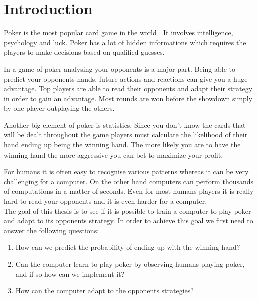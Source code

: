 \section*{Introduction}
Poker is the most popular card game in the world \cite{poker-popular}. It involves intelligence, psychology and luck. Poker has a lot of hidden informations which requires the players to make decisions based on qualified guesses.  

In a game of poker analysing your opponents is a major part. Being able to predict your opponents hands, future actions and reactions can give you a huge advantage. Top players are able to read their opponents and adapt their strategy in order to gain an advantage. Most rounds are won before the showdown simply by one player outplaying the others. 

Another big element of poker is statistics. Since you don't know the cards that will be dealt throughout the game players must calculate the likelihood of their hand ending up being the winning hand. The more likely you are to have the winning hand the more aggressive you can bet to maximize your profit. 

For humans it is often easy to recognise various patterns whereas it can be very challenging for a computer. On the other hand computers can perform thousands of computations in a matter of seconds. Even for most humans players it is really hard to read your opponents and it is even harder for a computer.\\

The goal of this thesis is to see if it is possible to train a computer to play poker and adapt to its opponents strategy. In order to achieve this goal we first need to answer the following questions:

\begin{enumerate}
  \item How can we predict the probability of ending up with the winning hand?
  \item Can the computer learn to play poker by observing humans playing poker, and if so how can we implement it?
  \item How can the computer adapt to the opponents strategies?
\end{enumerate}